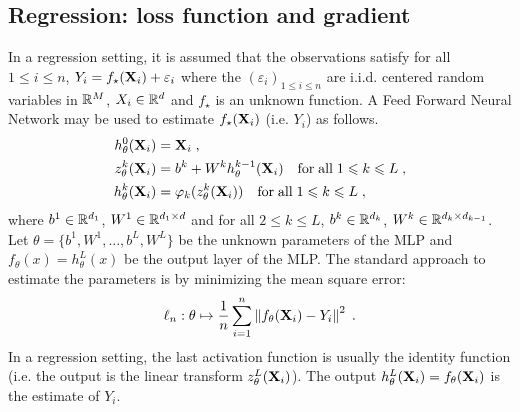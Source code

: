 \subsection{Regression: loss function and gradient}
In a regression setting, it is assumed that the observations satisfy for all $1\leqslant i \leqslant n$, $Y_i = f_\star(\mathbf{X}_i) + \varepsilon_i$ where the $(\varepsilon_i)_{1\leqslant i\leqslant n}$ are i.i.d. centered random variables in $\mathbb{R}^M$, $X_i\in\mathbb{R}^d$ and $f_{\star}$ is an unknown function.  A Feed Forward Neural Network may be used to estimate $f_\star(\mathbf{X}_i)$ (i.e. $Y_i$) as follows. 
\begin{align*}
h_{\theta}^0(\mathbf{X}_i) &= \mathbf{X}_i\;,\\
z_{\theta}^k(\mathbf{X}_i)  &= b^k + W^kh_{\theta}^{k-1}(\mathbf{X}_i)\quad \mathrm{for\;all\;} 1\leqslant k\leqslant L\;,\\
h_{\theta}^k(\mathbf{X}_i)  &= \varphi_k(z_{\theta}^{k}(\mathbf{X}_i))\quad \mathrm{for\;all\;}1\leqslant k\leqslant L\;,
\end{align*}
where $b^1\in\mathbb{R}^{d_1}$, $W^1\in\mathbb{R}^{d_1\times d}$ and for all $2\leqslant k\leqslant L$, $b^k\in\mathbb{R}^{d_k}$, $W^k\in\mathbb{R}^{d_k\times d_{k-1}}$.  Let $\theta = \{b^1,W^1,\ldots,b^L,W^L\}$ be the unknown parameters of the MLP and $f_{\theta}(x) = h_{\theta}^L(x)$ be the output layer of the MLP. The standard approach to estimate the parameters is by minimizing the mean square error:
$$
\ell_n:\theta \mapsto  \frac{1}{n} \sum_{i=1}^n\left\|f_{\theta}(\mathbf{X}_i) - Y_i\right\|^2\;.
$$
In a regression setting, the last activation function is usually the identity function (i.e. the output is the linear transform $z_{\theta}^L(\mathbf{X}_i)$). The output $h_{\theta}^L(\mathbf{X}_i)= f_{\theta}(\mathbf{X}_i) $ is the estimate of $Y_i$.

